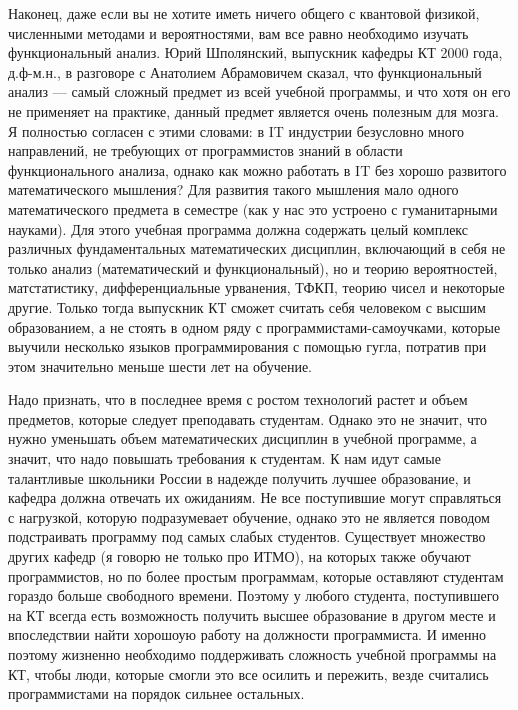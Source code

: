 \documentclass[russian]{article}
\begin{document}
Наконец, даже если вы не хотите иметь ничего общего с квантовой физикой, численными методами и вероятностями, вам все равно необходимо изучать функциональный анализ. Юрий Шполянский, выпускник кафедры КТ 2000 года, д.ф-м.н., в разговоре с Анатолием Абрамовичем сказал, что функциональный анализ --- самый сложный предмет из всей учебной программы, и что хотя он его не применяет на практике, данный предмет является очень полезным для мозга. Я полностью согласен с этими словами: в IT индустрии безусловно много направлений, не требующих от программистов знаний в области функционального анализа, однако как можно работать в IT без хорошо развитого математического мышления? Для развития такого мышления мало одного математического предмета в семестре (как у нас это устроено с гуманитарными науками). Для этого учебная программа должна содержать целый комплекс различных фундаментальных математических дисциплин, включающий в себя не только анализ (математический и функциональный), но и теорию вероятностей, матстатистику, дифференциальные урванения, ТФКП, теорию чисел и некоторые другие. Только тогда выпускник КТ сможет считать себя человеком с высшим образованием, а не стоять в одном ряду с программистами-самоучками, которые выучили несколько языков программирования с помощью гугла, потратив при этом значительно меньше шести лет на обучение.

Надо признать, что в последнее время с ростом технологий растет и объем предметов, которые следует преподавать студентам. Однако это не значит, что нужно уменьшать объем математических дисциплин в учебной программе, а значит, что надо повышать требования к студентам. К нам идут самые талантливые школьники России в надежде получить лучшее образование, и кафедра должна отвечать их ожиданиям. Не все поступившие могут справляться с нагрузкой, которую подразумевает обучение, однако это не является поводом подстраивать программу под самых слабых студентов. Существует множество других кафедр (я говорю не только про ИТМО), на которых также обучают программистов, но по более простым программам, которые оставляют студентам гораздо больше свободного времени. Поэтому у любого студента, поступившего на КТ всегда есть возможность получить высшее образование в другом месте и впоследствии найти хорошоую работу на должности программиста. И именно поэтому жизненно необходимо поддерживать сложность учебной программы на КТ, чтобы люди, которые смогли это все осилить и пережить, везде считались программистами на порядок сильнее остальных.



\end{document}
